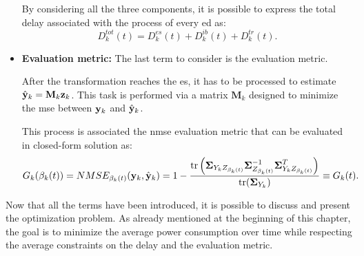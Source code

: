 \begin{itemize}[label={}]
    By considering all the three components, it is possible to express the total delay associated with the process of every \gls{ed} as:
    \begin{equation}
        D_k^{tot}(t) = D_k^{es}(t) + D_k^{ib}(t) + D_k^{tr}(t).
    \end{equation}

    \item {\textbf{Evaluation metric:}}
    The last term to consider is the evaluation metric.

    After the transformation reaches the \gls{es}, it has to be processed to estimate $\hat{\mathbf{y}}_k=\mathbf{M}_k\mathbf{z}_k$. This task is performed via a matrix $\mathbf{M}_k$ designed to minimize the \gls{mse} between $\mathbf{y}_k$ and $\hat{\mathbf{y}}_k$.

    This process is associated the \gls{nmse} evaluation metric that can be evaluated in closed-form solution as:
    \begin{equation}
        G_k(\beta_k(t)) = NMSE_{\beta_k(t)}(\mathbf{y}_k, \hat{\mathbf{y}}_k) =  1 - \frac{\mathrm{tr} \left( \boldsymbol{\Sigma}_{Y_kZ_{\beta_k(t)}} \boldsymbol{\Sigma}_{Z_{\beta_k(t)}}^{-1} \boldsymbol{\Sigma}_{Y_kZ_{\beta_k(t)}}^{T}\right)}{\mathrm{tr}(\boldsymbol{\Sigma}_{Y_k})} \equiv G_k(t).
    \end{equation}

\end{itemize}

Now that all the terms have been introduced, it is possible to discuss and present the optimization problem. As already mentioned at the beginning of this chapter, the goal is to minimize the average power consumption over time while respecting the average constraints on the delay and the evaluation metric.

